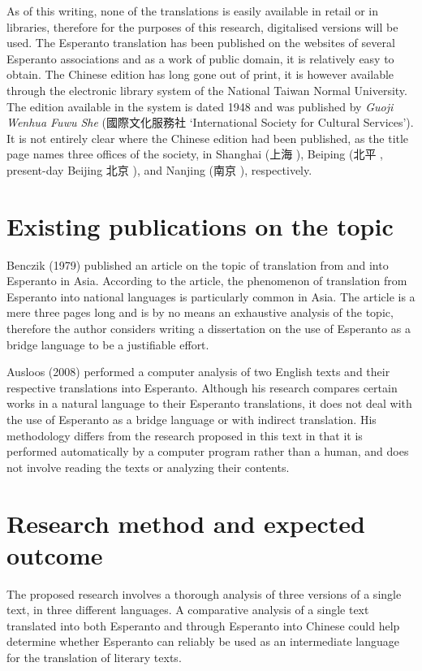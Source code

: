
As of this writing, none of the translations is easily available in retail or in libraries, therefore for the purposes of this research, digitalised versions will be used.
The Esperanto translation has been published on the websites of several Esperanto associations and as a work of public domain, it is relatively easy to obtain.
The Chinese edition has long gone out of print, it is however available through the electronic library system of the National Taiwan Normal University.
The edition available in the system is dated 1948 and was published by \textit{Guoji Wenhua Fuwu She} (國際文化服務社  `International Society for Cultural Services').
It is not entirely clear where the Chinese edition had been published, as the title page names three offices of the society, in Shanghai (上海 ), Beiping (北平 , present-day Beijing 北京 ), and Nanjing (南京 ), respectively.

\section{Existing publications on the topic}
Benczik (1979) published an article on the topic of translation from and into Esperanto in Asia.
According to the article, the phenomenon of translation from Esperanto into national languages is particularly common in Asia.
The article is a mere three pages long and is by no means an exhaustive analysis of the topic, therefore the author considers writing a dissertation on the use of Esperanto as a bridge language to be a justifiable effort.

Ausloos (2008) performed a computer analysis of two English texts and their respective translations into Esperanto.
Although his research compares certain works in a natural language to their Esperanto translations, it does not deal with the use of Esperanto as a bridge language or with indirect translation.
His methodology differs from the research proposed in this text in that it is performed automatically by a computer program rather than a human, and does not involve reading the texts or analyzing their contents.

\section{Research method and expected outcome}
The proposed research involves a thorough analysis of three versions of a single text, in three different languages.
A comparative analysis of a single text translated into both Esperanto and through Esperanto into Chinese could help determine whether Esperanto can reliably be used as an intermediate language for the translation of literary texts.

